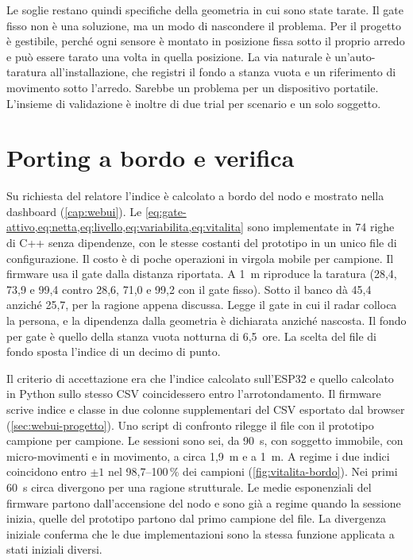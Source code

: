 Le soglie restano quindi specifiche della geometria in cui sono state tarate. Il gate
fisso non è una soluzione, ma un modo di nascondere il problema. Per il progetto è
gestibile, perché ogni sensore è montato in posizione fissa sotto il proprio arredo e
può essere tarato una volta in quella posizione. La via naturale è un'auto-taratura
all'installazione, che registri il fondo a stanza vuota e un riferimento di movimento
sotto l'arredo. Sarebbe un problema per un dispositivo portatile. L'insieme di
validazione è inoltre di due trial per scenario e un solo soggetto.

\section{Porting a bordo e verifica}
\label{sec:vitalita-bordo}

Su richiesta del relatore l'indice è calcolato a bordo del nodo e mostrato nella
dashboard (\cref{cap:webui}). Le
\cref{eq:gate-attivo,eq:netta,eq:livello,eq:variabilita,eq:vitalita} sono
implementate in 74 righe di C++ senza dipendenze, con le stesse costanti del prototipo
in un unico file di configurazione. Il costo è di poche operazioni in virgola mobile
per campione. Il firmware usa il gate dalla distanza riportata. A 1~m riproduce la
taratura (28,4, 73,9 e 99,4 contro 28,6, 71,0 e 99,2 con il gate fisso). Sotto il
banco dà 45,4 anziché 25,7, per la ragione appena discussa. Legge il gate in cui il
radar colloca la persona, e la dipendenza dalla geometria è dichiarata anziché
nascosta. Il fondo per gate è quello della stanza vuota notturna di 6,5~ore. La
scelta del file di fondo sposta l'indice di un decimo di punto.

Il criterio di accettazione era che l'indice calcolato sull'ESP32 e quello calcolato
in Python sullo stesso CSV coincidessero entro l'arrotondamento. Il firmware scrive
indice e classe in due colonne supplementari del CSV esportato dal browser
(\cref{sec:webui-progetto}). Uno script di confronto rilegge il file con il prototipo
campione per campione. Le sessioni sono sei, da 90~s, con soggetto immobile, con
micro-movimenti e in movimento, a circa 1,9~m e a 1~m. A regime i due indici
coincidono entro $\pm 1$ nel 98,7--100\,\% dei campioni (\cref{fig:vitalita-bordo}).
Nei primi 60~s circa divergono per una ragione strutturale. Le medie esponenziali del
firmware partono dall'accensione del nodo e sono già a regime quando la sessione
inizia, quelle del prototipo partono dal primo campione del file. La divergenza
iniziale conferma che le due implementazioni sono la stessa funzione applicata a stati
iniziali diversi.

